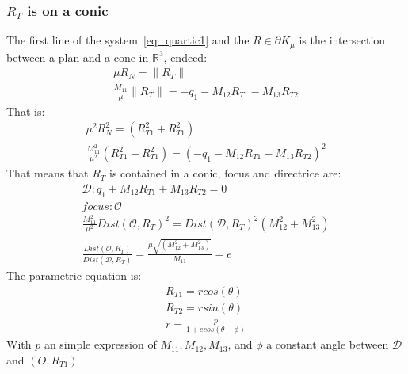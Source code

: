   \subsubsection{$R_T$ is on a conic}
  The first line of the system~\ref{eq_quartic1} and the $R \in \partial K_{\mu}$ is the intersection between a plan and a cone in $\mathbb{R}^3$, endeed:
  \begin{equation}
\label{eq_quartic2}
\begin{array}{l}
 \mu R_N =  \parallel R_T \parallel  \\
\frac{M_{11}}{\mu} \parallel R_T \parallel = -q_1-M_{12}R_{T1}-M_{13}R_{T2}
\end{array}
\end{equation}
That is:
\begin{equation}
\label{eq_quartic2}
\begin{array}{l}
\mu^2 R_N^2 =  (R_{T1}^2 +R_{T1}^2)  \\
\frac{M_{11}^2}{\mu^2} (R_{T1}^2 +R_{T1}^2)=(-q_1-M_{12}R_{T1}-M_{13}R_{T2})^2
\end{array}
\end{equation}
That means that $R_T$ is contained in a conic,  focus and directrice are:
\begin{equation}
\label{eq_quartic3}
\begin{array}{l}
\mathcal{D} : q_1+M_{12}R_{T1}+M_{13}R_{T2} =0  \\
focus : \mathcal{O}\\
\frac{M_{11}^2}{\mu^2}  Dist(\mathcal{O}, R_T) ^2=Dist(\mathcal{D},R_T)^2 (M_{12}^2+M_{13}^2)\\
\frac{Dist(\mathcal{O}, R_T)}{Dist(\mathcal{D},R_T)}=\frac{\mu\sqrt{(M_{12}^2+M_{13}^2)}}{M_{11} }=e
\end{array}
\end{equation}
The parametric equation is:
\begin{equation}
\label{eq_quartic4}
\begin{array}{l}
R_{T1}=r cos(\theta )\\
R_{T2}=r sin(\theta )\\
r=\frac{p}{1+ecos(\theta - \phi)}
\end{array}
\end{equation}
With $p$ an simple expression of $M_{11},M_{12},M_{13}$, and $\phi$ a constant angle between $\mathcal{D}$ and $(O,R_{T1})$
